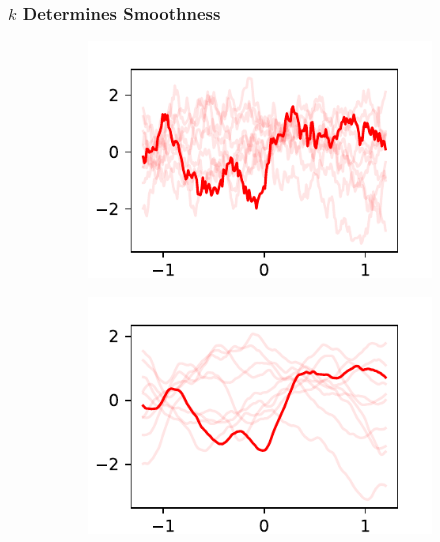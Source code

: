\documentclass{beamer}
\begin{document}
\begin{frame}
    \frametitle{$k$ Determines Smoothness}
    \begin{figure}
        \centering
        \begin{subfigure}[t]{0.4\textwidth}
            \centering
            \includegraphics[width=\textwidth]{maternonehalf_kernel.pdf}
        \end{subfigure}%
        \begin{subfigure}[t]{0.4\textwidth}
            \centering
            \includegraphics[width=\textwidth]{maternthreehalves_kernel.pdf}
        \end{subfigure}
        \begin{subfigure}[t]{0.4\textwidth}
            \centering

\end{subfigure}
\end{figure}
\end{frame}
\end{document}

